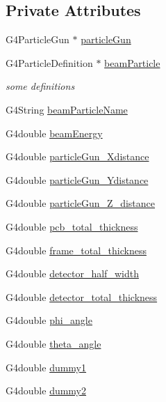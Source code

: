 \subsection*{Private Attributes}
\begin{DoxyCompactItemize}
\item 
G4\+Particle\+Gun $\ast$ \hyperlink{classUMPrimaryGeneratorAction_a787ca62e699ace1aa9cae6c42c9d7743}{particle\+Gun}
\item 
G4\+Particle\+Definition $\ast$ \hyperlink{classUMPrimaryGeneratorAction_a004f6a76d578f065cee7a3f1e1228abd}{beam\+Particle}
\begin{DoxyCompactList}\small\item\em some definitions \end{DoxyCompactList}\item 
G4\+String \hyperlink{classUMPrimaryGeneratorAction_aec782ea37985870020b9428534785a9b}{beam\+Particle\+Name}
\item 
G4double \hyperlink{classUMPrimaryGeneratorAction_a59b85366f8c349e736250e532d231e67}{beam\+Energy}
\item 
G4double \hyperlink{classUMPrimaryGeneratorAction_a10ad8439cfae25861c154f7c983d69c7}{particle\+Gun\+\_\+\+Xdistance}
\item 
G4double \hyperlink{classUMPrimaryGeneratorAction_ad8ca25605dc9d53d6f4c458bc53c9286}{particle\+Gun\+\_\+\+Ydistance}
\item 
G4double \hyperlink{classUMPrimaryGeneratorAction_a655f1759775835e3e687e8a9fdfd1889}{particle\+Gun\+\_\+\+Z\+\_\+distance}
\item 
G4double \hyperlink{classUMPrimaryGeneratorAction_a82995abaa2c42648522cacf20f9a9f4f}{pcb\+\_\+total\+\_\+thickness}
\item 
G4double \hyperlink{classUMPrimaryGeneratorAction_a9cfba814762d43a22df9b2da505d23c3}{frame\+\_\+total\+\_\+thickness}
\item 
G4double \hyperlink{classUMPrimaryGeneratorAction_a25173fd11d4081d650b3943cd52fe933}{detector\+\_\+half\+\_\+width}
\item 
G4double \hyperlink{classUMPrimaryGeneratorAction_acf85442c095148faf0055372cc70911d}{detector\+\_\+total\+\_\+thickness}
\item 
G4double \hyperlink{classUMPrimaryGeneratorAction_a4de1dd00da08850d4d260248fff6f2ae}{phi\+\_\+angle}
\item 
G4double \hyperlink{classUMPrimaryGeneratorAction_a254fcb36e5b52349847120db69071ec9}{theta\+\_\+angle}
\item 
G4double \hyperlink{classUMPrimaryGeneratorAction_a8fdaaf24898f8c34087558bc4c740b55}{dummy1}
\item 
G4double \hyperlink{classUMPrimaryGeneratorAction_ade806eed80671f071afebf82e0a8ad68}{dummy2}
\end{DoxyCompactItemize}


